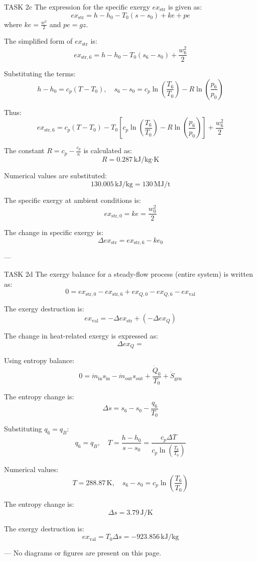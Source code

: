 TASK 2c  
The expression for the specific exergy \( ex_{\text{str}} \) is given as:  
\[
ex_{\text{str}} = h - h_0 - T_0(s - s_0) + ke + pe
\]  
where \( ke = \frac{w^2}{2} \) and \( pe = gz \).  

The simplified form of \( ex_{\text{str}} \) is:  
\[
ex_{\text{str},6} = h - h_0 - T_0(s_6 - s_0) + \frac{w_6^2}{2}
\]  

Substituting the terms:  
\[
h - h_0 = c_p(T - T_0), \quad s_6 - s_0 = c_p \ln\left(\frac{T_6}{T_0}\right) - R \ln\left(\frac{p_6}{p_0}\right)
\]  

Thus:  
\[
ex_{\text{str},6} = c_p(T - T_0) - T_0 \left[ c_p \ln\left(\frac{T_6}{T_0}\right) - R \ln\left(\frac{p_6}{p_0}\right) \right] + \frac{w_6^2}{2}
\]  

The constant \( R = c_p - \frac{c_p}{\kappa} \) is calculated as:  
\[
R = 0.287 \, \text{kJ/kg·K}
\]  

Numerical values are substituted:  
\[
130.005 \, \text{kJ/kg} = 130 \, \text{MJ/t}
\]  

The specific exergy at ambient conditions is:  
\[
ex_{\text{str},0} = ke = \frac{w_0^2}{2}
\]  

The change in specific exergy is:  
\[
\Delta ex_{\text{str}} = ex_{\text{str},6} - ke_0
\]  

---

TASK 2d  
The exergy balance for a steady-flow process (entire system) is written as:  
\[
0 = ex_{\text{str},0} - ex_{\text{str},6} + ex_{Q,0} - ex_{Q,6} - ex_{\text{val}}
\]  

The exergy destruction is:  
\[
ex_{\text{val}} = -\Delta ex_{\text{str}} + (-\Delta ex_Q)
\]  

The change in heat-related exergy is expressed as:  
\[
\Delta ex_Q = 
\]  

Using entropy balance:  
\[
0 = \dot{m}_{\text{in}} s_{\text{in}} - \dot{m}_{\text{out}} s_{\text{out}} + \frac{\dot{Q}_0}{T_0} + \dot{S}_{\text{gen}}
\]  

The entropy change is:  
\[
\Delta s = s_6 - s_0 - \frac{q_6}{T_0}
\]  

Substituting \( q_6 = q_B \):  
\[
q_6 = q_B, \quad T = \frac{h - h_0}{s - s_0} = \frac{c_p \Delta T}{c_p \ln\left(\frac{T_6}{T_0}\right)}
\]  

Numerical values:  
\[
T = 288.87 \, \text{K}, \quad s_6 - s_0 = c_p \ln\left(\frac{T_6}{T_0}\right)
\]  

The entropy change is:  
\[
\Delta s = 3.79 \, \text{J/K}
\]  

The exergy destruction is:  
\[
ex_{\text{val}} = T_0 \Delta s = -923.856 \, \text{kJ/kg}
\]  

---  
No diagrams or figures are present on this page.